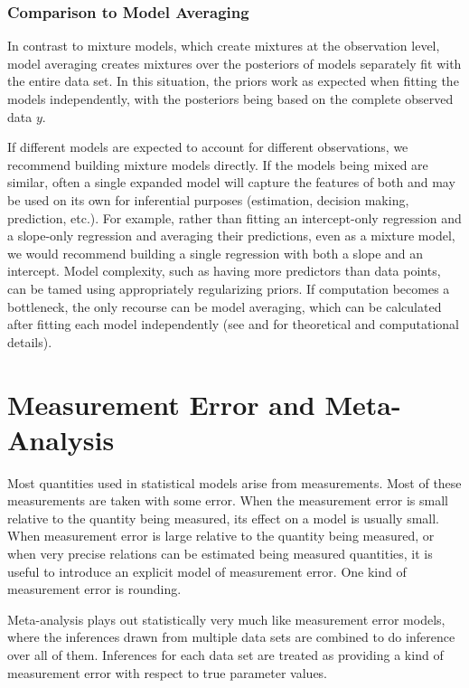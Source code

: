 \subsection{Comparison to Model Averaging}

In contrast to mixture models, which create mixtures at the
observation level, model averaging creates mixtures over the
posteriors of models separately fit with the entire data set.  In this
situation, the priors work as expected when fitting the models
independently, with the posteriors being based on the complete observed
data $y$.

If different models are expected to account for different
observations, we recommend building mixture models directly.  If the
models being mixed are similar, often a single expanded model will
capture the features of both and may be used on its own for
inferential purposes (estimation, decision making, prediction, etc.).
For example, rather than fitting an intercept-only regression and a
slope-only regression and averaging their predictions, even as a
mixture model, we would recommend building a single regression with
both a slope and an intercept.  Model complexity, such as having more
predictors than data points, can be tamed using appropriately
regularizing priors.  If computation becomes a bottleneck, the only
recourse can be model averaging, which can be calculated after fitting
each model independently (see \citep{HoetingEtAl:1999} and
\citep{GelmanEtAl:2013} for theoretical and computational details).


\chapter{Measurement Error and Meta-Analysis}

\noindent
Most quantities used in statistical models arise from measurements.
Most of these measurements are taken with some error.  When the
measurement error is small relative to the quantity being measured,
its effect on a model is usually small.  When measurement error is
large relative to the quantity being measured, or when very precise
relations can be estimated being measured quantities, it is useful to
introduce an explicit model of measurement error.  One kind of
measurement error is rounding. 

Meta-analysis plays out statistically very much like measurement error
models, where the inferences drawn from multiple data sets are
combined to do inference over all of them.  Inferences for each data
set are treated as providing a kind of measurement error with respect
to true parameter values.


